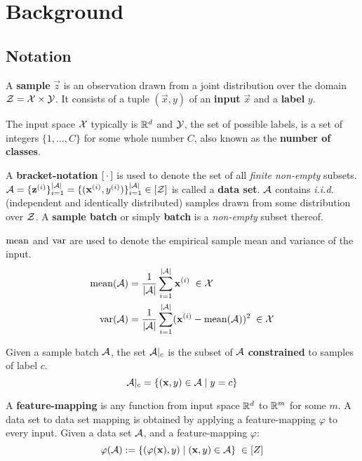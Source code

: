 

\chapter{Background}
\label{chap:Background}

\section{Notation}

A \textbf{sample} $\vec z$ is an observation drawn from a joint distribution over the domain $\mathcal Z = \mathcal X \times \mathcal Y$. 
It consists of a tuple $(\vec x, y)$ of an \textbf{input} $\vec x$ and a \textbf{label} $y$. 

\noindent
The input space $\mathcal X$ typically is $\mathbb{R}^d$ and $\mathcal Y$, the set of possible labels, is a set of integers $\{1, \dots, C\}$ for some whole number $C$, also known as the \textbf{number of classes}.

\noindent
A \textbf{bracket-notation} $[\, \cdot \,]$ is used to denote the set of all \textit{finite non-empty} subsets.
$\mathcal A = \{\mathbf z^{(i)}\}_{i=1}^{| \mathcal A |} = \{(\mathbf x^{(i)}, y^{(i)})\}_{i=1}^{| \mathcal A |} \in [\mathcal Z]$ is called a \textbf{data set}. $\mathcal A $ contains \textit{i.i.d.} (independent and identically distributed) samples drawn from some distribution over $\mathcal Z$.
A \textbf{sample batch} or simply \textbf{batch} is a \textit{non-empty} subset thereof.

\noindent
$\operatorname{mean}$ and $\operatorname{var}$ are used to denote the empirical sample mean and variance of the input.
\begin{align}
    \operatorname{mean} ({\mathcal A}) &= \frac 1 {\lvert \mathcal A \rvert} \sum _{i=1}^{\lvert \mathcal A \rvert} \mathbf x^{(i)} \; \in \mathcal X
    \label{eqn:sample_mean} \\
    \operatorname{var} ({\mathcal A}) &= \frac 1 {\lvert \mathcal A \rvert} \sum _{i=1}^{\lvert \mathcal A \rvert} (\mathbf x^{(i)} - \operatorname{mean} ({\mathcal A}))^2 \; \in \mathcal X 
    \label{eqn:sample_var} 
\end{align}


Given a sample batch $\mathcal A$, the set $\mathcal A|_c$ is the subset of $\mathcal A$ \textbf{constrained} to samples of label $c$.
\begin{equation}
    \mathcal A|_c = \{(\mathbf x, y) \in \mathcal A \mid y = c\}
    \label{eqn:class_constrained}
\end{equation}

A \textbf{feature-mapping} is any function from input space $\mathbb{R}^d$ to $\mathbb{R}^m$ for some $m$.
A data set to data set mapping is obtained by applying a feature-mapping $\varphi$ to every input. Given a data set $\mathcal A$, and a feature-mapping $\varphi$:
\begin{equation}
    \varphi(\mathcal A) := \{(\varphi(\mathbf x), y) \mid (\mathbf x, y) \in \mathcal A\} \;
    \in [Z]
    \label{eqn:feature_mapping}
\end{equation}



